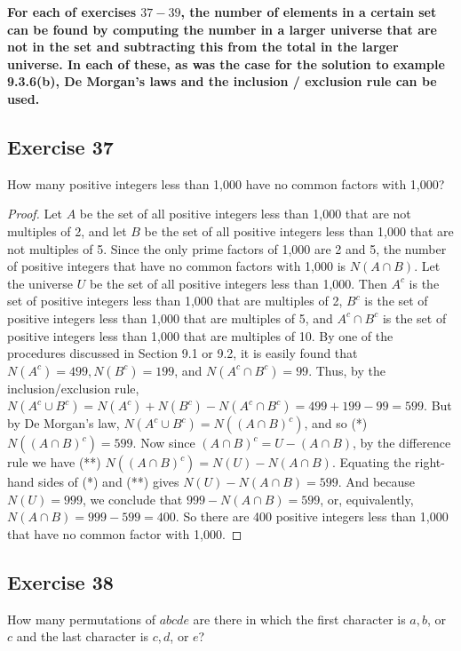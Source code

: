 \documentclass[14pt]{extarticle}
\newcommand{\cy}{\color{cyan}}
\begin{document}
{\bf \cy For each of exercises $37-39$, the number of elements in a certain set can be found by computing the 
number in a larger universe that are not in the set and subtracting this from the total in the larger universe. In 
each of these, as was the case for the solution to example 9.3.6(b), De Morgan’s laws and the inclusion / exclusion 
rule can be used.}

\subsection{Exercise 37}
How many positive integers less than 1,000 have no common factors with 1,000?

\begin{proof}
Let $A$ be the set of all positive integers less than 1,000 that are not multiples of 2, and let $B$ be the set of all 
positive integers less than 1,000 that are not multiples of 5. Since the only prime factors of 1,000 are 2 and 5, the 
number of positive integers that have no common factors with 1,000 is \(N(A \cap B)\). Let the universe $U$ be the 
set of all positive integers less than 1,000. Then \(A^c\) is the set of positive integers less than 1,000 that are 
multiples of 2, \(B^c\) is the set of positive integers less than 1,000 that are multiples of 5, and \(A^c \cap 
B^c\) is the set of positive integers less than 1,000 that are multiples of 10. By one of the procedures discussed in 
Section 9.1 or 9.2, it is easily found that \(N(A^c) = 499, N(B^c) = 199\), and \(N(A^c \cap B^c) = 99\). Thus, by the 
inclusion/exclusion rule, \(N(A^c \cup B^c) = N(A^c) + N(B^c) - N(A^c \cap B^c) = 499 + 199 - 99 = 599\). But by 
De Morgan’s law, \(N(A^c \cup B^c) = N((A \cap B)^c)\), and so (*) \(N((A \cap B)^c) = 599\). Now since \((A \cap B)^c 
= U - (A \cap B)\), by the difference rule we have (**) \(N((A \cap B)^c) = N(U) - N(A \cap B)\). Equating the 
right-hand sides of (*) and (**) gives \(N(U) - N(A \cap B) = 599\). And because \(N(U) = 999\), we conclude that \(999 
- N(A \cap B) = 599\), or, equivalently, \(N(A \cap B) = 999 - 599 = 400\). So there are 400 positive integers less 
than 1,000 that have no common factor with 1,000.
\end{proof}

\subsection{Exercise 38}
How many permutations of \(abcde\) are there in which the first character is \(a, b\), or $c$ and the last character is \(c, d\), or $e$?
\end{document}
